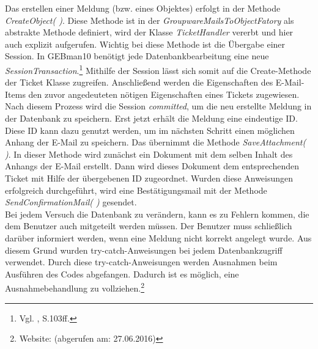 \noindent
Das erstellen einer Meldung (bzw. eines Objektes) erfolgt in der Methode \textit{CreateObject( )}. Diese Methode ist in der \textit{GroupwareMailsToObjectFatory} als abstrakte Methode definiert, wird der Klasse \textit{TicketHandler} vererbt und hier auch explizit aufgerufen. Wichtig bei diese Methode ist die Übergabe einer Session. In GEBman10 benötigt jede Datenbankbearbeitung eine neue \textit{SessionTransaction}.\footnote{Vgl. \citeauthor{Fowler} \citeyear{Fowler}, S.103ff.} 
Mithilfe der Session lässt sich somit auf die Create-Methode der Ticket Klasse zugreifen. Anschließend werden die Eigenschaften des E-Mail-Items den zuvor angedeuteten nötigen Eigenschaften eines Tickets zugewiesen. Nach diesem Prozess wird die Session \textit{committed}, um die neu erstellte Meldung in der Datenbank zu speichern. Erst jetzt erhält die Meldung eine eindeutige ID. Diese ID kann dazu genutzt werden, um im nächsten Schritt einen möglichen Anhang der E-Mail zu speichern. Das übernimmt die Methode \textit{SaveAttachment( )}. In dieser Methode wird zunächst ein Dokument mit dem selben Inhalt des Anhangs der E-Mail erstellt. Dann wird dieses Dokument dem entsprechenden Ticket mit Hilfe der übergebenen ID zugeordnet. Wurden diese Anweisungen erfolgreich durchgeführt, wird eine Bestätigungsmail mit der Methode \textit{SendConfirmationMail( )} gesendet.\\

\noindent
Bei jedem Versuch die Datenbank zu verändern, kann es zu Fehlern kommen, die dem Benutzer auch mitgeteilt werden müssen. Der Benutzer muss schließlich darüber informiert werden, wenn eine Meldung nicht korrekt angelegt wurde. Aus diesem Grund wurden try-catch-Anweisungen bei jedem Datenbankzugriff verwendet. Durch diese try-catch-Anweisungen werden Ausnahmen beim Ausführen des Codes abgefangen. Dadurch ist es möglich, eine Ausnahmebehandlung zu vollziehen.\footnote{Website: \citeauthor{TryCatch} (abgerufen am: 27.06.2016)}\\


